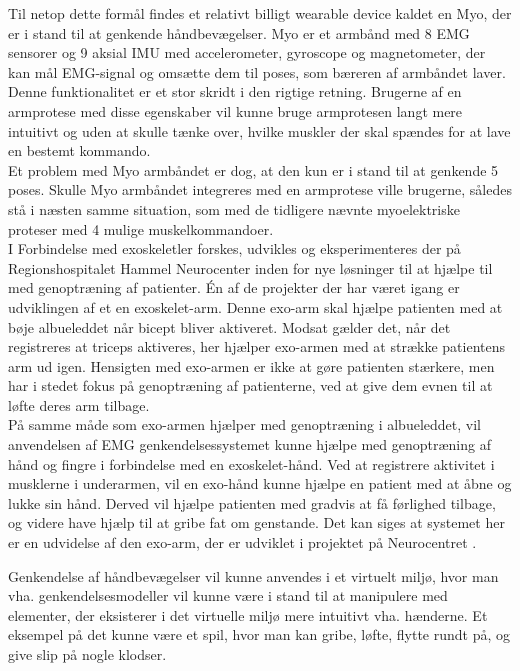 Til netop dette formål findes et relativt billigt wearable device kaldet en Myo, der er i stand til at genkende håndbevægelser. Myo er et armbånd med 8 EMG sensorer og 9 aksial IMU med accelerometer, gyroscope og magnetometer, der kan mål EMG-signal og omsætte dem til poses, som bæreren af armbåndet laver. \\
Denne funktionalitet er et stor skridt i den rigtige retning. Brugerne af en armprotese med disse egenskaber vil kunne bruge armprotesen langt mere intuitivt og uden at skulle tænke over, hvilke muskler der skal spændes for at lave en bestemt kommando.\\
Et problem med Myo armbåndet er dog, at den kun er i stand til at genkende 5 poses. Skulle Myo armbåndet integreres med en armprotese ville brugerne, således stå i næsten samme situation, som med de tidligere nævnte myoelektriske proteser med 4 mulige muskelkommandoer.\\

I Forbindelse med exoskeletler forskes, udvikles og eksperimenteres der på Regionshospitalet Hammel Neurocenter inden for nye løsninger til at hjælpe til med genoptræning af patienter. Én af de projekter der har været igang er udviklingen af et en exoskelet-arm. Denne exo-arm skal hjælpe patienten med at bøje albueleddet når bicept bliver aktiveret. Modsat gælder det, når det registreres at triceps aktiveres, her hjælper exo-armen med at strække patientens arm ud igen. Hensigten med exo-armen er ikke at gøre patienten stærkere, men har i stedet fokus på genoptræning af patienterne, ved at give dem evnen til at løfte deres arm tilbage.\\

På samme måde som exo-armen hjælper med genoptræning i albueleddet, vil anvendelsen af EMG genkendelsessystemet kunne hjælpe med genoptræning af hånd og fingre i forbindelse med en exoskelet-hånd. Ved at registrere aktivitet i musklerne i underarmen, vil en exo-hånd kunne hjælpe en patient med at åbne og lukke sin hånd. Derved vil hjælpe patienten med gradvis at få førlighed tilbage, og videre have hjælp til at gribe fat om genstande. Det kan siges at systemet her er en udvidelse af den exo-arm, der er udviklet i projektet på Neurocentret \citep{RefWorks:7}.

Genkendelse af håndbevægelser vil kunne anvendes i et virtuelt miljø, hvor man vha.  genkendelsesmodeller vil kunne være i stand til at manipulere med elementer, der eksisterer i det virtuelle miljø mere intuitivt vha. hænderne. Et eksempel på det kunne være et spil, hvor man kan gribe, løfte, flytte rundt på, og give slip på nogle klodser.

